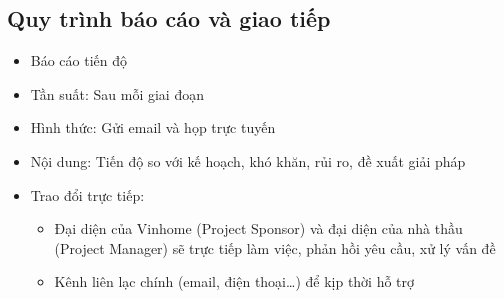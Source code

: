 \subsection{Quy trình báo cáo và giao tiếp}
\begin{itemize}
    \item Báo cáo tiến độ
    \item Tần suất: Sau mỗi giai đoạn
    \item Hình thức: Gửi email và họp trực tuyến
    \item Nội dung: Tiến độ so với kế hoạch, khó khăn, rủi ro, đề xuất giải pháp
    \item Trao đổi trực tiếp:
    \begin{itemize}
        \item Đại diện của Vinhome (Project Sponsor) và đại diện của nhà thầu (Project Manager) sẽ trực tiếp làm việc, phản hồi yêu cầu, xử lý vấn đề
        \item Kênh liên lạc chính (email, điện thoại…) để kịp thời hỗ trợ
    \end{itemize}
\end{itemize}
